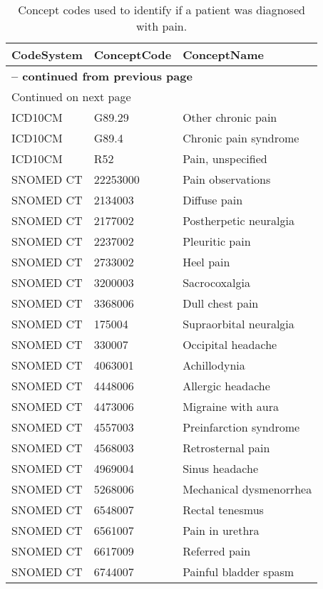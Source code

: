 \begin{longtable}{p{}p{}p{}}
\caption{Concept codes used to identify if a patient was diagnosed with pain.} \\ 
 CodeSystem & ConceptCode & ConceptName \\ 
  \hline 
\endfirsthead 
\multicolumn{3}{p{\textwidth}}{{ \bfseries \tablename \thetable{} -- continued from previous page}} \ 
\hline CodeSystem & ConceptCode & ConceptName \\ \hline 
\endhead 
\hline \multicolumn{3}{p{\textwidth}}{{Continued on next page}} \\ \hline 
\endfoot 
\hline 
\endlastfoot 
 \hline
ICD10CM & G89.29 & Other chronic pain \\ 
  ICD10CM & G89.4 & Chronic pain syndrome \\ 
  ICD10CM & R52 & Pain, unspecified \\ 
  SNOMED CT & 22253000 & Pain observations \\ 
  SNOMED CT & 2134003 & Diffuse pain \\ 
  SNOMED CT & 2177002 & Postherpetic neuralgia \\ 
  SNOMED CT & 2237002 & Pleuritic pain \\ 
  SNOMED CT & 2733002 & Heel pain \\ 
  SNOMED CT & 3200003 & Sacrocoxalgia \\ 
  SNOMED CT & 3368006 & Dull chest pain \\ 
  SNOMED CT & 175004 & Supraorbital neuralgia \\ 
  SNOMED CT & 330007 & Occipital headache \\ 
  SNOMED CT & 4063001 & Achillodynia \\ 
  SNOMED CT & 4448006 & Allergic headache \\ 
  SNOMED CT & 4473006 & Migraine with aura \\ 
  SNOMED CT & 4557003 & Preinfarction syndrome \\ 
  SNOMED CT & 4568003 & Retrosternal pain \\ 
  SNOMED CT & 4969004 & Sinus headache \\ 
  SNOMED CT & 5268006 & Mechanical dysmenorrhea \\ 
  SNOMED CT & 6548007 & Rectal tenesmus \\ 
  SNOMED CT & 6561007 & Pain in urethra \\ 
  SNOMED CT & 6617009 & Referred pain \\ 
  SNOMED CT & 6744007 & Painful bladder spasm \\ 

\end{longtable}
